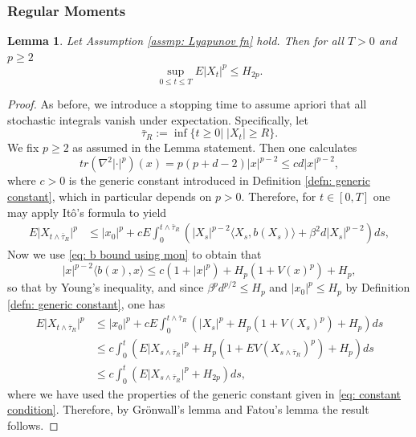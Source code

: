 \documentclass{article}
\newtheorem{lemma}{Lemma}
\begin{document}
\subsubsection{Regular Moments}
\begin{lemma}\label{lem: mom bounds cont non-uniform}
    Let Assumption \ref{assmp: Lyapunov fn} hold. Then for all $T>0$ and $p\geq 2 $ 
    \begin{equation}
       \sup_{0\leq t\leq T}  E\lvert X_t \rvert ^p\leq H_{2p}.
    \end{equation}
\end{lemma}
\begin{proof}
        As before, we introduce a stopping time to assume apriori that all stochastic integrals vanish under expectation. Specifically, let
    \begin{equation}
        \bar{\tau}_R:=\inf\{t\geq 0 \vert \; \lvert X_t\rvert \geq R \}.
    \end{equation}
    We fix $p\geq 2$ as assumed in the Lemma statement. Then one calculates
    \begin{equation}\label{eq: calc for second derivative}
       tr(\nabla^2\lvert \cdot\rvert^p)(x)=p(p+d-2)\lvert x\rvert^{p-2}\leq cd\lvert x\rvert^{p-2}, 
    \end{equation}
        where $c>0$ is the generic constant introduced in Definition \ref{defn: generic constant}, which in particular depends on $p>0$. Therefore, for $t\in [0,T]$ one may apply Itô's formula to yield
        \begin{align}\label{eq: Ito's formula cont}
  E\lvert X_{t \wedge \bar{\tau}_R} \rvert^p &\leq \lvert x_0\rvert^p+cE\int^{t \wedge \bar{\tau}_R}_0 (\lvert X_s\rvert^{p-2}\langle X_s, b(X_s)\rangle+\beta^2 d\lvert X_s\rvert^{p-2})ds,
    \end{align}
    Now we use \eqref{eq: b bound using mon} to obtain that
    \begin{equation}\label{eq: inner product calculation}
        \lvert x \rvert^{p-2}\langle b(x),x \rangle\leq c(1+\lvert x \rvert^p)+H_p(1+V(x)^p)+H_p,
    \end{equation}
    so that by Young's inequality, and since $\beta^pd^{p/2}\leq H_p$ and $\lvert x_0\rvert^p\leq H_p$ by Definition \ref{defn: generic constant}, one has
    \begin{align}
  E\lvert X_{t \wedge \bar{\tau}_R} \rvert^p &\leq \lvert x_0\rvert^p+cE\int^{t \wedge \bar{\tau}_R}_0 (\lvert X_s\rvert^p+H_p(1+V( X_s)^p)+H_p)ds\nonumber \\
  &\leq c\int^{t}_0 (E\lvert X_{s \wedge \bar{\tau}_R}\rvert^p+H_p(1+EV( X_{s \wedge \bar{\tau}_R})^p)+H_p)ds\nonumber \\
  &\leq c\int^{t}_0 (E\lvert X_{s \wedge \bar{\tau}_R}\rvert^p+H_{2p})ds,
    \end{align}
    where we have used the properties of the generic constant given in \eqref{eq: constant condition}. Therefore, by Grönwall's lemma and Fatou's lemma the result follows.
\end{proof}
\end{document}
